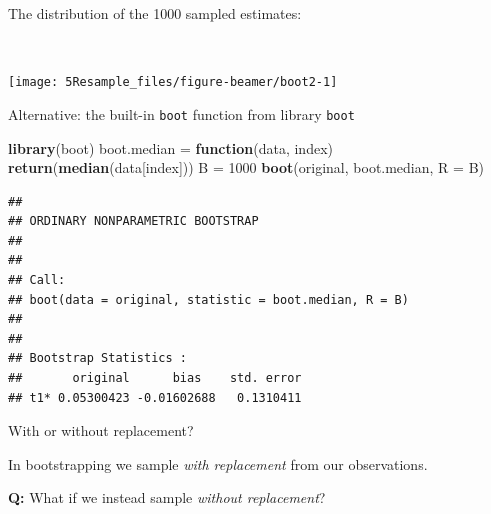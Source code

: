\documentclass[
  10pt,
  ignorenonframetext,
]{beamer}
\newenvironment{Shaded}{\begin{snugshade}}{\end{snugshade}}
\newcommand{\AttributeTok}[1]{\textcolor[rgb]{0.13,0.29,0.53}{#1}}
\newcommand{\ControlFlowTok}[1]{\textcolor[rgb]{0.13,0.29,0.53}{\textbf{#1}}}
\newcommand{\DecValTok}[1]{\textcolor[rgb]{0.00,0.00,0.81}{#1}}
\newcommand{\FunctionTok}[1]{\textcolor[rgb]{0.13,0.29,0.53}{\textbf{#1}}}
\newcommand{\NormalTok}[1]{#1}
\newcommand{\OtherTok}[1]{\textcolor[rgb]{0.56,0.35,0.01}{#1}}
\begin{document}
\begin{frame}
The distribution of the 1000 sampled estimates:

\(~\)

\begin{center}\texttt{[image: 5Resample\_files/figure-beamer/boot2-1]} \end{center}
\end{frame}

\begin{frame}[fragile]
\begin{block}{Alternative: the built-in \texttt{boot} function from
library \texttt{boot}}
\protect\hypertarget{alternative-the-built-in-boot-function-from-library-boot}{}
\(~\)

\scriptsize

\begin{Shaded}
\begin{Highlighting}[]
\FunctionTok{library}\NormalTok{(boot)}
\NormalTok{boot.median }\OtherTok{=} \ControlFlowTok{function}\NormalTok{(data, index) }\FunctionTok{return}\NormalTok{(}\FunctionTok{median}\NormalTok{(data[index]))}
\NormalTok{B }\OtherTok{=} \DecValTok{1000}
\FunctionTok{boot}\NormalTok{(original, boot.median, }\AttributeTok{R =}\NormalTok{ B)}
\end{Highlighting}
\end{Shaded}

\begin{verbatim}
## 
## ORDINARY NONPARAMETRIC BOOTSTRAP
## 
## 
## Call:
## boot(data = original, statistic = boot.median, R = B)
## 
## 
## Bootstrap Statistics :
##       original      bias    std. error
## t1* 0.05300423 -0.01602688   0.1310411
\end{verbatim}
\end{block}
\end{frame}

\begin{frame}
\begin{block}{With or without replacement?}
\protect\hypertarget{with-or-without-replacement}{}
\vspace{2mm}

In bootstrapping we sample \emph{with replacement} from our
observations.

\vspace{4mm}

\textbf{Q:} What if we instead sample \emph{without replacement}?

\vspace{2mm}

\vspace{4mm}
\end{block}
\end{frame}
\end{document}
